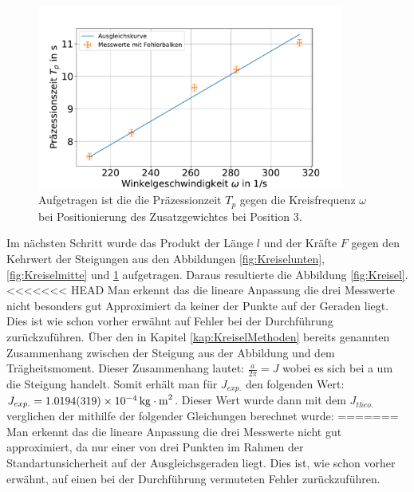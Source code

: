 \begin{figure}[h]
	\centering
	\includegraphics[width=0.9\textwidth]{res/sproHzoben.pdf}
	\caption{Aufgetragen ist die die Präzessionzeit $T_p$ gegen die Kreisfrequenz $\omega$ bei Positionierung des Zusatzgewichtes bei Position 3.}
		\label{fig:Kreiseloben}
	\end{figure}
Im nächsten Schritt wurde das Produkt der Länge $l$ und der Kräfte $F$ gegen den Kehrwert der Steigungen aus den Abbildungen  \ref{fig:Kreiselunten}, \ref{fig:Kreiselmitte} und \ref{fig:Kreiseloben} aufgetragen. 
Daraus resultierte die Abbildung \ref{fig:Kreisel}.
<<<<<<< HEAD
Man erkennt das die lineare Anpassung die drei Messwerte nicht besonders gut Approximiert da keiner der Punkte auf der Geraden liegt. Dies ist wie schon vorher erwähnt auf Fehler bei der Durchführung zurückzuführen.
Über den in Kapitel \ref{kap:KreiselMethoden} bereits genannten Zusammenhang zwischen der Steigung aus der Abbildung und dem Trägheitsmoment.
Dieser Zusammenhang lautet: $\frac{a}{2\pi}=J$ wobei es sich bei a um die Steigung handelt. Somit erhält man für $J_{exp.}$ den folgenden Wert: $J_{exp.}=\SI{1,0194+-0,0319e-4}{kg \cdot m^2}$. Dieser Wert wurde dann mit dem $J_{theo.}$ verglichen der mithilfe der folgender Gleichungen berechnet wurde:
=======
Man erkennt das die lineare Anpassung die drei Messwerte nicht gut approximiert, da nur einer von drei Punkten im Rahmen der Standartunsicherheit auf der Ausgleichsgeraden liegt. Dies ist, wie schon vorher erwähnt, auf einen bei der Durchführung vermuteten Fehler zurückzuführen.
